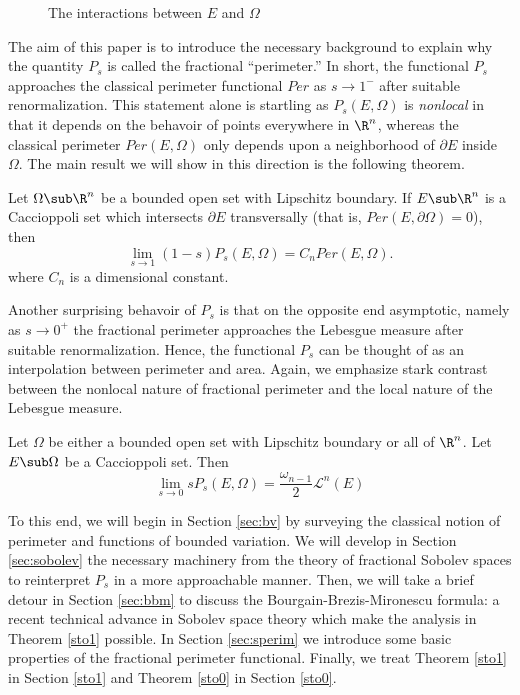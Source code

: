 \documentclass[../main.tex]{subfiles}
\begin{document}
\begin{figure}[H]\label{fig:interactions}
    
    \caption{The interactions between $ E $ and $ \Omega $}
\end{figure}

The aim of this paper is to introduce the necessary background to explain why the quantity $ P_{s} $ is called the fractional ``perimeter.'' In short, the functional $ P_{s} $ approaches the classical perimeter functional $ Per $ as $ s\to1^{-} $ after suitable renormalization. This statement alone is startling as $ P_{s}(E,\Omega) $ is \textit{nonlocal} in that it depends on the behavoir of points everywhere in $ \R^{n} $, whereas the classical perimeter $ Per(E,\Omega) $ only depends upon a neighborhood of $ \partial E $ inside $ \Omega $. The main result we will show in this direction is the following theorem.
\begin{maintheorem}\label{sto1}
    Let $ \Omega\sub \R^{n} $ be a bounded open set with Lipschitz boundary. If $ E\sub \R^{n} $ is a Caccioppoli set which intersects $ \partial E $ transversally (that is, $Per(E, \partial \Omega) = 0$), then
    \begin{equation}
        \lim_{s\to1}(1-s) P_{s}(E, \Omega) = C_{n} Per(E,\Omega).
    \end{equation}
    where $ C_{n} $ is a dimensional constant.
\end{maintheorem}
Another surprising behavoir of $ P_{s} $ is that on the opposite end asymptotic, namely as $ s\to0^{+} $ the fractional perimeter approaches the Lebesgue measure after suitable renormalization. Hence, the functional $ P_{s} $ can be thought of as an interpolation between perimeter and area. Again, we emphasize stark contrast between the nonlocal nature of fractional perimeter and the local nature of the Lebesgue measure.
\begin{maintheorem}\label{sto0}
    Let $ \Omega $ be either a bounded open set with Lipschitz boundary or all of $ \R^{n} $. Let $ E\sub \Omega $ be a Caccioppoli set. Then 
    \begin{equation}
        \lim_{s\to0} sP_{s}(E,\Omega) = \frac{\omega_{n-1}}{2} \mathcal{L}^{n}(E)
    \end{equation}
\end{maintheorem}
To this end, we will begin in Section \ref{sec:bv} by surveying the classical notion of perimeter and functions of bounded variation. We will develop in Section \ref{sec:sobolev} the necessary machinery from the theory of fractional Sobolev spaces to reinterpret $ P_{s} $ in a more approachable manner. Then, we will take a brief detour in Section \ref{sec:bbm} to discuss the Bourgain-Brezis-Mironescu formula: a recent technical advance in Sobolev space theory which make the analysis in Theorem \ref{sto1} possible. In Section \ref{sec:sperim} we introduce some basic properties of the fractional perimeter functional. Finally, we treat Theorem \ref{sto1} in Section \ref{sto1} and Theorem \ref{sto0} in Section \ref{sto0}.
\end{document}
